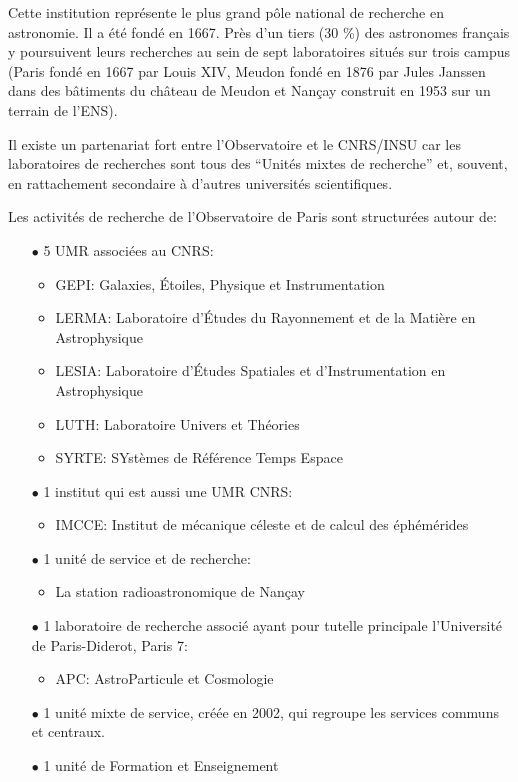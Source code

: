 Cette institution représente le plus grand pôle national de recherche en astronomie. Il a été fondé en 1667. Près d’un tiers (30 \%) des astronomes français y poursuivent leurs recherches au sein de sept laboratoires situés sur trois campus (Paris fondé en 1667 par Louis XIV, Meudon fondé en 1876 par Jules Janssen dans des bâtiments du château de Meudon et Nançay construit en 1953 sur un terrain de l’ENS).

Il existe un partenariat fort entre l’Observatoire et le CNRS/INSU car les laboratoires de recherches sont tous des “Unités mixtes de recherche” et, souvent, en rattachement secondaire à d’autres universités scientifiques.

Les activités de recherche de l’Observatoire de Paris sont structurées autour de:


\begin{itemize}
\item[$\bullet$] 5 UMR associées au CNRS:
	\begin{itemize}
	\item GEPI: Galaxies, Étoiles, Physique et Instrumentation
	\item LERMA: Laboratoire d’Études du Rayonnement et de la Matière en Astrophysique
	\item LESIA: Laboratoire d’Études Spatiales et d’Instrumentation en Astrophysique
	\item LUTH: Laboratoire Univers et Théories
	\item SYRTE: SYstèmes de Référence Temps Espace
	\end{itemize}
\item[$\bullet$] 1 institut qui est aussi une UMR CNRS:
	\begin{itemize}
	\item IMCCE: Institut de mécanique céleste et de calcul des éphémérides
	\end{itemize}
\item[$\bullet$] 1 unité de service et de recherche:
	\begin{itemize}
	\item La station radioastronomique de Nançay
	\end{itemize}
\item[$\bullet$] 1 laboratoire de recherche associé ayant pour tutelle principale l’Université de Paris-Diderot, Paris 7:
	\begin{itemize}
	\item APC: AstroParticule et Cosmologie
	\end{itemize}
\item[$\bullet$] 1 unité mixte de service, créée en 2002, qui regroupe les services communs et centraux.
\item[$\bullet$] 1 unité de Formation et Enseignement\\
\end{itemize}

